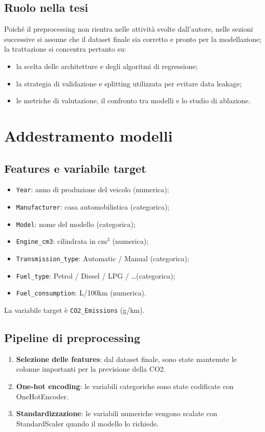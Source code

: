 \documentclass[a4paper,12pt]{report}
\begin{document}
	\subsection{Ruolo nella tesi}
	Poiché il preprocessing non rientra nelle attività svolte dall'autore, nelle sezioni successive si assume che il dataset finale sia corretto e pronto per la modellazione; la trattazione si concentra pertanto su:
	\begin{itemize}
		\item la scelta delle architetture e degli algoritmi di regressione;
		\item la strategia di validazione e splitting utilizzata per evitare data leakage;
		\item le metriche di valutazione, il confronto tra modelli e lo studio di ablazione.
	\end{itemize}
	
	\section{Addestramento modelli}
	
	\subsection{Features e variabile target}
	\begin{itemize}
		\item \texttt{Year}: anno di produzione del veicolo (numerica);
		\item \texttt{Manufacturer}: casa automobilistica (categorica);
		\item \texttt{Model}: nome del modello (categorica);
		\item \texttt{Engine\_cm3}: cilindrata in \(\mathrm{cm^3}\) (numerica);
		\item \texttt{Transmission\_type}: Automatic / Manual (categorica);
		\item \texttt{Fuel\_type}: Petrol / Diesel / LPG / \ldots (categorica);
		\item \texttt{Fuel\_consumption}: L/100km (numerica).
	\end{itemize}
	La variabile target è \texttt{CO2\_Emissions} (g/km).
	
	\subsection{Pipeline di preprocessing}
	\begin{enumerate}
		\item \textbf{Selezione delle features}: dal dataset finale, sono state mantenute le colonne importanti per la previsione della CO2.
		\item \textbf{One-hot encoding}: le variabili categoriche sono state codificate con OneHotEncoder.
		\item \textbf{Standardizzazione}: le variabili numeriche vengono scalate con StandardScaler quando il modello lo richiede.
	\end{enumerate}
	
\end{document}
